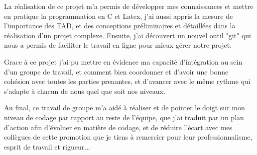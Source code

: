 %
  La réalisation de ce projet m'a permis de développer mes connaissances et mettre en pratique la programmation en C et Latex, j'ai aussi appris la mesure de l'importance des TAD, et des conceptions préliminaires et détaillées dans la réalisation d'un projet complexe. Ensuite, j'ai découvert un nouvel outil "git" qui nous a permis de faciliter le travail en ligne pour mieux gérer notre projet.
 
  Grace à ce projet j'ai pu mettre en évidence ma capacité d'intégration au sein d'un groupe de travail, et comment bien coordonner et d'avoir une bonne cohésion avec toutes les parties prenantes, et d'avancer avec le même rythme qui s'adapte à chacun de nous quel que soit nos niveaux.

  Au final, ce travail de groupe m'a aidé à réaliser et de pointer le doigt sur mon niveau de codage par rapport au reste de l'équipe, que j'ai traduit par un plan d'action afin d'évoluer en matière de codage, et de réduire l'écart avec mes collègues de cette promotion que je tiens à remercier pour leur professionnalisme, esprit de travail et rigueur...
  
